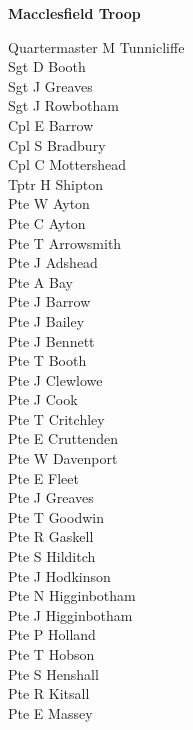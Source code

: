 \vspace*{10mm}

\pagebreak

\begin{center}
  \Large
  \textbf{Macclesfield Troop}
\end{center}

\vspace*{10mm}

\begin{multicols}{3}
  \small
  \noindent
  Quartermaster M Tunnicliffe \\
  Sgt D Booth \\
  Sgt J Greaves \\
  Sgt J Rowbotham \\
  Cpl E Barrow \\
  Cpl S Bradbury \\
  Cpl C Mottershead \\
  Tptr H Shipton \\
  Pte W Ayton \\
  Pte C Ayton \\
  Pte T Arrowsmith \\
  Pte J Adshead \\
  Pte A Bay \\
  Pte J Barrow \\
  Pte J Bailey \\
  Pte J Bennett \\
  Pte T Booth \\
  Pte J Clewlowe \\
  Pte J Cook \\
  Pte T Critchley \\
  Pte E Cruttenden \\
  Pte W Davenport \\
  Pte E Fleet \\
  Pte J Greaves \\
  Pte T Goodwin \\
  Pte R Gaskell \\
  Pte S Hilditch \\
  Pte J Hodkinson \\
  Pte N Higginbotham \\
  Pte J Higginbotham \\
  Pte P Holland \\
  Pte T Hobson \\
  Pte S Henshall \\
  Pte R Kitsall \\
  Pte E Massey \\

\end{multicols}
